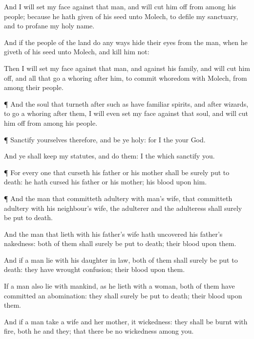 {And I will
set my
face against that
man, and will cut him
off from
among his
people; because he hath
given of his
seed unto
Molech, to
defile my
sanctuary, and to
profane my
holy
name.

And if the
people of the
land do any
ways
hide their
eyes from the
man, when he
giveth of his
seed unto
Molech, and
kill him
not:

Then I will
set my
face against that
man, and against his
family, and will cut him
off, and all that go a
whoring
after him, to commit
whoredom with
Molech, from
among their
people.


\par }{\PP {}¶ And the
soul that
turneth
after such as have familiar
spirits, and
after
wizards, to go a
whoring
after them, I will even
set my
face against that
soul, and will cut him
off from
among his
people.


\par }{\PP {}¶
Sanctify yourselves therefore, and be ye
holy: for I
{} the
{} your
God.

And ye shall
keep my
statutes, and
do them: I
{} the
{} which
sanctify you.


\par }{\PP {}¶ For
every
one that
curseth his
father or his
mother shall be
surely put to
death: he hath
cursed his
father or his
mother; his
blood
{} upon him.


\par }{\PP {}¶ And the
man that committeth
adultery with
{}
man’s
wife,
{} that committeth
adultery with his
neighbour’s
wife, the
adulterer and the
adulteress shall
surely be put to
death.

And the
man that
lieth with his
father’s
wife hath
uncovered his
father’s
nakedness:
both of them shall
surely be put to
death; their
blood
{} upon them.

And if a
man
lie with his daughter in
law,
both of them shall
surely be put to
death: they have
wrought
confusion; their
blood
{} upon them.

If a
man also
lie with
mankind, as he
lieth with a
woman,
both of them have
committed an
abomination: they shall
surely be put to
death; their
blood
{} upon them.

And if a
man
take a
wife and her
mother, it
{}
wickedness: they shall be
burnt with
fire, both he and they; that there be no
wickedness
among you.

}
